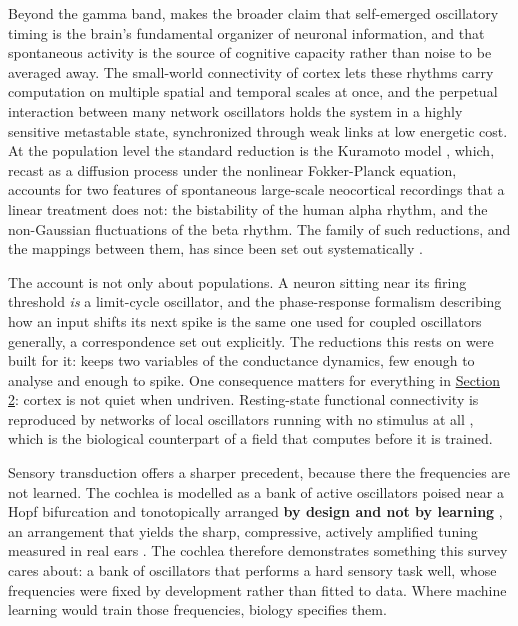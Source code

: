 \documentclass[a4paper,fleqn]{cas-sc}
\begin{document}
Beyond the gamma band, \citet{buzsaki2006} makes the broader claim that
self-emerged oscillatory timing is the brain's fundamental organizer of
neuronal information, and that spontaneous activity is the source of
cognitive capacity rather than noise to be averaged away. The
small-world connectivity of cortex lets these rhythms carry computation
on multiple spatial and temporal scales at once, and the perpetual
interaction between many network oscillators holds the system in a
highly sensitive metastable state, synchronized through weak links at
low energetic cost. At the population level the standard reduction is
the Kuramoto model \citep{breakspear2010}, which, recast as a diffusion
process under the nonlinear Fokker-Planck equation, accounts for two
features of spontaneous large-scale neocortical recordings that a linear
treatment does not: the bistability of the human alpha rhythm, and the
non-Gaussian fluctuations of the beta rhythm. The family of such
reductions, and the mappings between them, has since been set out
systematically \citep{castaldo2026}.

The account is not only about populations. A neuron sitting near its
firing threshold \emph{is} a limit-cycle oscillator, and the
phase-response formalism describing how an input shifts its next spike
is the same one used for coupled oscillators generally, a correspondence
\citet{stiefel2016} set out explicitly. The reductions this rests on
were built for it: \citet{morris1981} keeps two variables of the
\citet{hodgkin1952} conductance dynamics, few enough to analyse and
enough to spike. One consequence matters for everything in
\hyperref[sec-2]{Section 2}: cortex is not quiet when undriven.
Resting-state functional connectivity is reproduced by networks of local
oscillators running with no stimulus at all \citep{cabral2011}, which is
the biological counterpart of a field that computes before it is
trained.

Sensory transduction offers a sharper precedent, because there the
frequencies are not learned. The cochlea is modelled as a bank of active
oscillators poised near a Hopf bifurcation and tonotopically arranged
\textbf{by design and not by learning} \citep{camalet2000}, an
arrangement that yields the sharp, compressive, actively amplified
tuning measured in real ears \citep{kern2003}. The cochlea therefore
demonstrates something this survey cares about: a bank of oscillators
that performs a hard sensory task well, whose frequencies were fixed by
development rather than fitted to data. Where machine learning would
train those frequencies, biology specifies them.
\end{document}
